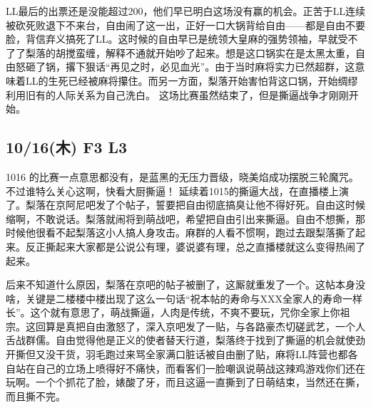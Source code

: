 LL最后的出票还是没能超过200，他们早已明白这场没有赢的机会。正苦于LL连续被砍死败退下不来台，自由闹了这一出，正好一口大锅背给自由——都是自由不要脸，背信弃义搞死了LL。这时候的自由早已是统领大皇麻的强势领袖，早就受不了了梨落的胡搅蛮缠，解释不通就开始吵了起来。想是这口锅实在是太黑太重，自由怒砸了锅，撂下狠话“再见之时，必见血光”。由于当时麻将实力已然超群，这意味着LL的生死已经被麻将攥住。而另一方面，梨落开始害怕背这口锅，开始绸缪利用旧有的人际关系为自己洗白。
这场比赛虽然结束了，但是撕逼战争才刚刚开始。

\subsection{10/16(木) F3 L3}


1016 的比赛一点意思都没有，是蓝黑的无压力晋级，晓美焰成功摆脱三轮魔咒。不过谁特么关心这啊，快看大厨撕逼！
延续着1015的撕逼大战，在直播楼上演了。梨落在京阿尼吧发了个帖子，誓要把自由彻底搞臭让他不得好死。自由这时候缩啊，不敢说话。梨落就闹将到萌战吧，希望把自由引出来撕逼。自由不想撕，那时候他很看不起梨落这小人搞人身攻击。麻群的人看不惯啊，跑过去跟梨落撕了起来。反正撕起来大家都是公说公有理，婆说婆有理，总之直播楼就这么变得热闹了起来。

后来不知道什么原因，梨落在京吧的帖子被删了，这厮就重发了一个。这帖本身没啥，关键是二楼楼中楼出现了这么一句话“祝本帖的寿命与XXX全家人的寿命一样长”。这个就有意思了，萌战撕逼，人肉是传统，不爽不要玩，咒你全家上你祖宗。这回算是真把自由激怒了，深入京吧发了一贴，与各路豪杰切磋武艺，一个人舌战群儒。自由觉得他是正义的使者替天行道，梨落终于找到了撕逼的机会就使劲开撕但又没干货，羽毛跑过来骂全家满口脏话被自由删了贴，麻将LL阵营也都各自站在自己的立场上喷得好不痛快，而看客们一脸嘲讽说萌战这辣鸡游戏你们还在玩啊。一个个抓花了脸，婊酸了牙，而且这逼一直撕到了日萌结束，当然还在撕，而且撕不完。

